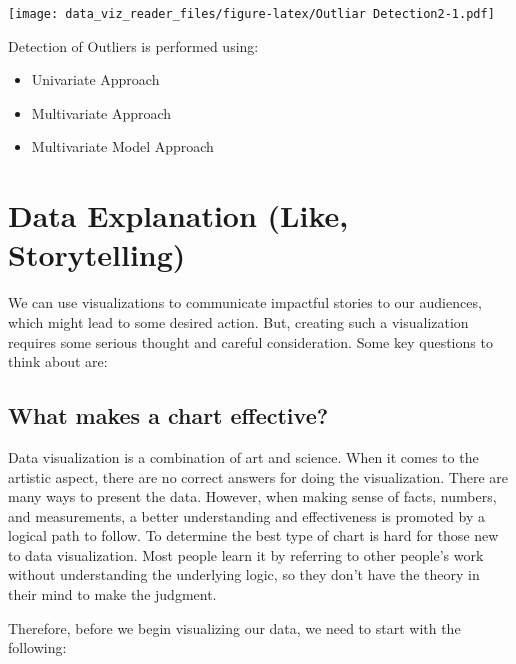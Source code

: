 \documentclass[]{book}
\providecommand{\tightlist}{%
  \setlength{\itemsep}{0pt}\setlength{\parskip}{0pt}}
\begin{document}
\texttt{[image: data\_viz\_reader\_files/figure-latex/Outliar Detection2-1.pdf]}

Detection of Outliers is performed using:

\begin{itemize}
\tightlist
\item
  Univariate Approach
\item
  Multivariate Approach
\item
  Multivariate Model Approach
\end{itemize}

\hypertarget{data-explanation-like-storytelling}{%
\section{Data Explanation (Like, Storytelling)}\label{data-explanation-like-storytelling}}

We can use visualizations to communicate impactful stories to our audiences, which might lead to some desired action. But, creating such a visualization requires some serious thought and careful consideration. Some key questions to think about are:

\hypertarget{what-makes-a-chart-effective}{%
\subsection{What makes a chart effective?}\label{what-makes-a-chart-effective}}

Data visualization is a combination of art and science. When it comes to the artistic aspect, there are no correct answers for doing the visualization. There are many ways to present the data. However, when making sense of facts, numbers, and measurements, a better understanding and effectiveness is promoted by a logical path to follow. To determine the best type of chart is hard for those new to data visualization. Most people learn it by referring to other people's work without understanding the underlying logic, so they don't have the theory in their mind to make the judgment.

Therefore, before we begin visualizing our data, we need to start with the following:
\end{document}
